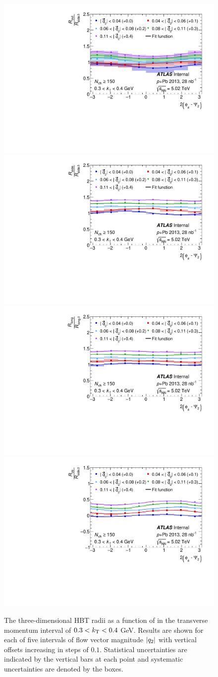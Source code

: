 \begin{figure}[t]
\centering
\includegraphics[width=.49\linewidth]{can_Rout_vs_phi_kt2.pdf}
\includegraphics[width=.49\linewidth]{can_Rside_vs_phi_kt2.pdf}\\
\includegraphics[width=.49\linewidth]{can_Rlong_vs_phi_kt2.pdf}
\includegraphics[width=.49\linewidth]{can_Ros_vs_phi_kt2.pdf}\\
\caption{The three-dimensional HBT radii as a function of \kphi in the transverse momentum interval of $0.3 < k_\mathrm{T} < 0.4$ GeV. Results are shown for each of five intervals of flow vector magnitude $|q_{2}|$ with vertical offsets increasing in steps of $0.1$. Statistical uncertainties are indicated by the vertical bars at each point and systematic uncertainties are denoted by the boxes.}
\label{fig:Rosl_vs_phi}
\end{figure}


